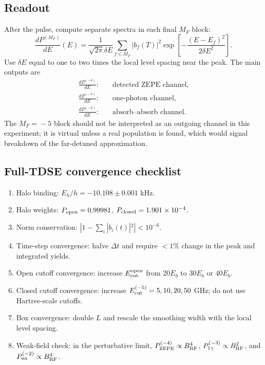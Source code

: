 \documentclass[11pt,a4paper]{article}
\newcommand{\MF}[1]{M_F\!=\!#1}
\begin{document}
\subsection{Readout}

After the pulse, compute separate spectra in each final $M_F$ block:
\begin{equation}
\frac{dP^{(M_F)}}{dE}(E)=\frac{1}{\sqrt{2\pi}\delta E}
\sum_{f\in M_F}|b_f(T)|^2
\exp\left[-\frac{(E-E_f)^2}{2\delta E^2}\right].
\end{equation}
Use $\delta E$ equal to one to two times the local level spacing near the peak.
The main outputs are
\begin{align}
\frac{dP^{(-4)}}{dE}:&\quad \text{detected ZEPE channel},\\
\frac{dP^{(-3)}}{dE}:&\quad \text{one-photon channel},\\
\frac{dP^{(-2)}}{dE}:&\quad \text{absorb--absorb channel}.
\end{align}
The $\MF{-5}$ block should not be interpreted as an outgoing channel in this
experiment; it is virtual unless a real population is found, which would signal
breakdown of the far-detuned approximation.

\subsection{Full-TDSE convergence checklist}

\begin{enumerate}[leftmargin=2em,itemsep=2pt]
\item Halo binding: $E_h/h=-10.108\pm0.001$ kHz.
\item Halo weights: $P_{\rm open}=0.99981$, $P_{\rm closed}=1.901\times10^{-4}$.
\item Norm conservation: $|1-\sum_i|b_i(t)|^2|<10^{-6}$.
\item Time-step convergence: halve $\Delta t$ and require $<1\%$ change in the peak and integrated yields.
\item Open cutoff convergence: increase $E_{\rm cut}^{\rm open}$ from $20E_b$ to $30E_b$ or $40E_b$.
\item Closed cutoff convergence: increase $E_{\rm cut}^{(-5)}=5,10,20,50$ GHz; do not use Hartree-scale cutoffs.
\item Box convergence: double $L$ and rescale the smoothing width with the local level spacing.
\item Weak-field check: in the perturbative limit, $P^{(-4)}_{\rm ZEPE}\propto B_{\rm RF}^4$, $P^{(-3)}_{1\gamma}\propto B_{\rm RF}^2$, and $P^{(-2)}_{aa}\propto B_{\rm RF}^4$.
\end{enumerate}
\end{document}
